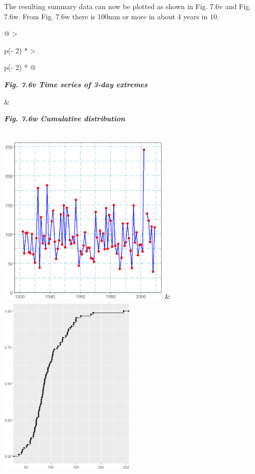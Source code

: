 \documentclass[
  letterpaper,
  DIV=11,
  numbers=noendperiod]{scrreprt}
\begin{document}
The resulting summary data can now be plotted as shown in Fig. 7.6v and
Fig. 7.6w. From Fig. 7.6w there is 100mm or more in about 4 years in 10.

\begin{longtable}[]{@{}
  >{\raggedright\arraybackslash}p{(\columnwidth - 2\tabcolsep) * }
  >{\raggedright\arraybackslash}p{(\columnwidth - 2\tabcolsep) * }@{}}
\toprule\noalign{}
\begin{minipage}[b]{\linewidth}\raggedright
\textbf{\emph{Fig. 7.6v Time series of 3-day extremes}}
\end{minipage} & \begin{minipage}[b]{\linewidth}\raggedright
\textbf{\emph{Fig. 7.6w Cumulative distribution}}
\end{minipage} \\
\midrule\noalign{}
\endhead
\bottomrule\noalign{}
\endlastfoot
\includegraphics[width=3.25255in,height=3.24878in]{figures/Fig7.6v.png}
&
\includegraphics[width=2.59782in,height=3.46376in]{figures/Fig7.6w.png} \\
\end{longtable}
\end{document}
